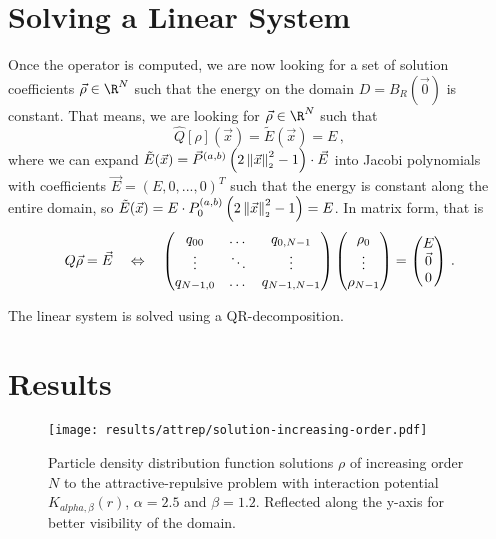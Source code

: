 \pagebreak
\section{Solving a Linear System}
Once the operator is computed, we are now looking for a set of solution coefficients $\vec{\rho} \in \R^N$ such that the energy on the domain $D = B_R(\vec{0})$ is constant.
That means, we are looking for $\vec{\rho} \in \R^N$ such that
\begin{equation}
  \hat{Q}[\rho](\vec{x}) = \tilde{E}(\vec{x}) = E\,,
\end{equation}
where we can expand $\tilde{E}(\vec{x}) = \vec{P}^{(a, b)}\left(2 \left\lVert\vec{x}\right\rVert_{\scriptscriptstyle 2}^2 - 1\right) \cdot \vec{E}$ into Jacobi polynomials with coefficients $\vec{E} = (E, 0, ..., 0)^T$ such that the energy is constant along the entire domain, so $\tilde{E}(\vec{x}) = E \cdot P_0^{(a, b)}\left(2 \left\lVert\vec{x}\right\rVert_{\scriptscriptstyle 2}^2 - 1\right) = E$.
In matrix form, that is
$$Q \vec{\rho} = \vec{E} \quad\Leftrightarrow\quad \begin{pmatrix}
    q_{00}    & \dots  & q_{0,N-1}   \\
    \vdots    & \ddots & \vdots      \\
    q_{N-1,0} & \dots  & q_{N-1,N-1} \\
  \end{pmatrix} \begin{pmatrix}
    \rho_0 \\
    \vdots \\
    \rho_{N-1}
  \end{pmatrix} = \begin{pmatrix}
    E       \\
    \vec{0} \\
    0
  \end{pmatrix}\,.$$

The linear system is solved using a QR-decomposition.


\section{Results}
\begin{figure}[H]
  \centering
  \texttt{[image: results/attrep/solution-increasing-order.pdf]}
  \caption[Solutions of increasing orders]{Particle density distribution function solutions $\rho$ of increasing order $N$ to the attractive-repulsive problem with interaction potential $K_{alpha, \beta}(r)$, $\alpha = 2.5$ and $\beta = 1.2$. Reflected along the y-axis for better visibility of the domain.}
  \label{fig:solution-increasing-order}
\end{figure}

